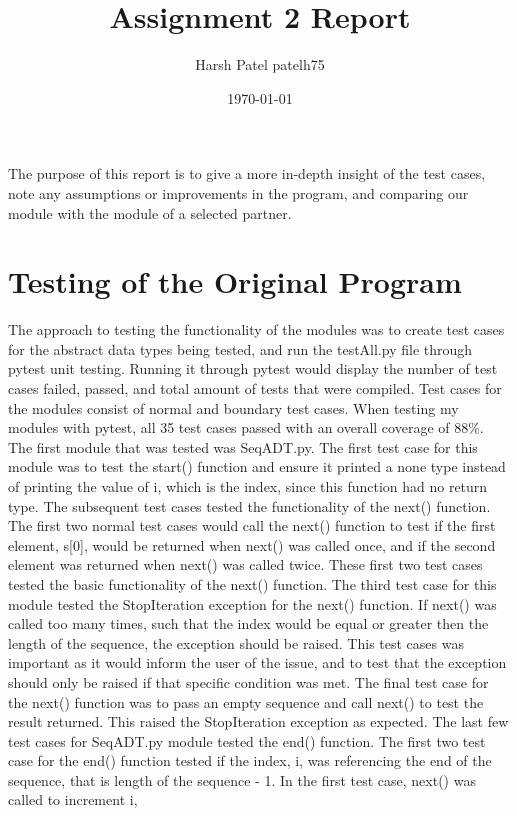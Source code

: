 \documentclass[12pt]{article}
\title{Assignment 2 Report}
\author{Harsh Patel patelh75}
\date{\today}
\begin{document}
\maketitle

The purpose of this report is to give a more in-depth insight of the test cases, note any assumptions or improvements in the program, 
and comparing our module with the module of a selected partner.

\section{Testing of the Original Program}

The approach to testing the functionality of the modules was to create test cases for the abstract data types being tested, and run the testAll.py file
through pytest unit testing. Running it through pytest would display the number of test cases failed, passed, and total amount of tests that were compiled.
Test cases for the modules consist of normal and boundary test cases. When testing my modules with pytest, all 35 test cases passed with an overall coverage of
88\%. The first module that was tested was SeqADT.py. The first test case for this module was to test the start() function and ensure it printed a none type instead
of printing the value of i, which is the index, since this function had no return type. The subsequent test cases tested the functionality of the next() function. The first
two normal test cases would call the next() function to test if the first element, s[0], would be returned when next() was called once, and if the second element was returned
when next() was called twice. These first two test cases tested the basic functionality of the next() function. The third test case for this module tested the StopIteration exception
for the next() function. If next() was called too many times, such that the index would be equal or greater then the length of the sequence, the exception should be raised. This test cases
was important as it would inform the user of the issue, and to test that the exception should only be raised if that specific condition was met. The final test case for the next() function
was to pass an empty sequence and call next() to test the result returned. This raised the StopIteration exception as expected. The last few test cases for SeqADT.py module tested the end() function.
The first two test case for the end() function tested if the index, i, was referencing the end of the sequence, that is length of the sequence - 1. In the first test case, next() was called to increment i,
\end{document}
